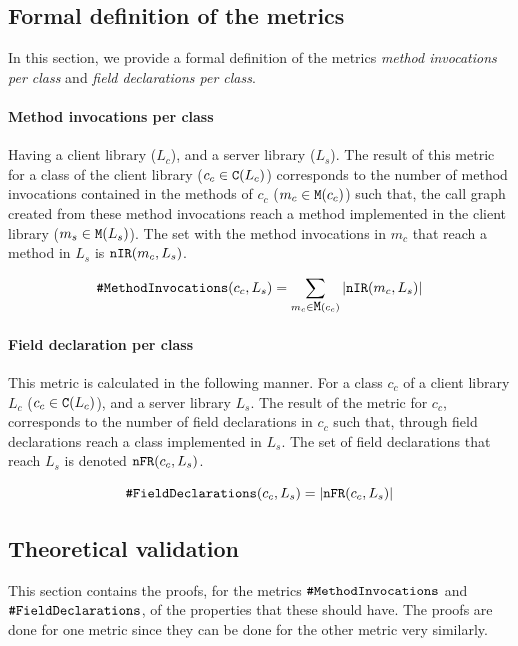 \subsection{Formal definition of the metrics}
In this section, we provide a formal definition of the metrics \textit{method invocations per class} and \textit{field declarations per class}.

\paragraph{Method invocations per class}
Having a client library ($L_c$), and a server library ($L_s$). The result of this metric for a class of the client library ($c_c \in \verb|C|(L_c)$) corresponds to the number of method invocations contained in the methods of $c_c$ ($m_c \in \verb|M|(c_c)$) such that, the call graph created from these method invocations reach a method implemented in the client library ($m_s \in \verb|M|(L_s)$). The set with the method invocations in $m_c$ that reach a method in $L_s$ is $\verb|nIR|(m_c, L_s)$.

\begin{equation}
\label{eqn:mi}
    \verb|#MethodInvocations|(c_c, L_s) =  \sum_{m_c \in \verb|M|(c_c)} |\verb|nIR|(m_c, L_s)|
\end{equation}

\paragraph{Field declaration per class}
This metric is calculated in the following manner. For a class $c_c$ of a client library $L_c$ ($c_c \in \verb|C|(L_c)$), and a server library $L_s$. The result of the metric for $c_c$, corresponds to the number of field declarations in $c_c$ such that, through field declarations reach a class implemented in $L_s$. The set of field declarations that reach $L_s$ is denoted $\verb|nFR|(c_c, L_s)$.

\begin{equation}
\label{eqn:fd}
    \verb|#FieldDeclarations|(c_c, L_s) = |\verb|nFR|(c_c, L_s)|
\end{equation}

\subsection{Theoretical validation}
This section contains the proofs, for the metrics $\verb|#MethodInvocations|$ and $\verb|#FieldDeclarations|$, of the properties that these should have. The proofs are done for one metric since they can be done for the other metric very similarly.

